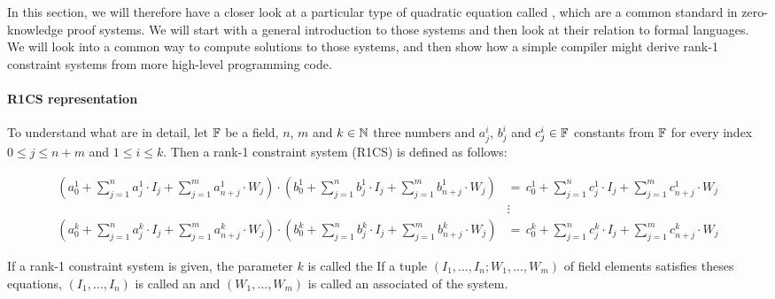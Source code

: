 In this section, we will therefore have a closer look at a particular type of quadratic equation called , which are a common standard in zero-knowledge proof systems. We will start with a general introduction to those systems and then look at their relation to formal languages. We will look into a common way to compute solutions to those systems, and then show how a simple compiler might derive rank-1 constraint systems from more high-level programming code. 

\paragraph{R1CS representation} To understand what  are in detail, let $\mathbb{F}$ be a field, $n$, $m$ and $k\in\mathbb{N}$ three numbers and $a_j^i$, $b_j^i$ and $c_j^i\in\mathbb{F}$ constants from $\mathbb{F}$ for every index $0\leq j \leq n+m$ and $1\leq i \leq k$. Then a rank-1 constraint system (R1CS) is defined as follows: 

\begin{definition}{}\label{R1CS}
\begin{align*}
\scriptstyle\left(a^1_0 + \sum_{j=1}^n a^1_j \cdot I_j + \sum_{j=1}^m a^1_{n+j} \cdot W_j  \right) \cdot 
\left(b^1_0 + \sum_{j=1}^n b^1_j \cdot I_j + \sum_{j=1}^m b^1_{n+j} \cdot W_j  \right) &=\, 
\scriptstyle c^1_0 + \sum_{j=1}^n c^1_j \cdot I_j + \sum_{j=1}^m c^1_{n+j} \cdot W_j\\
       & \vdots\\
\scriptstyle\left(a^k_0 + \sum_{j=1}^n a^k_j \cdot I_j + \sum_{j=1}^m a^k_{n+j} \cdot W_j  \right) \cdot 
\left(b^k_0 + \sum_{j=1}^n b^k_j \cdot I_j + \sum_{j=1}^m b^k_{n+j} \cdot W_j  \right) &=\, 
\scriptstyle c^k_0 + \sum_{j=1}^n c^k_j \cdot I_j + \sum_{j=1}^m c^k_{n+j} \cdot W_j       
\end{align*}
\end{definition}
If a rank-1 constraint system is given, the parameter $k$ is called the   If a tuple $(I_1,\ldots, I_n; W_1,\ldots,W_m)$ of field elements satisfies theses equations, $(I_1,\ldots, I_n)$ is called an  and $(W_1,\ldots,W_m)$ is called an associated  of the system.

